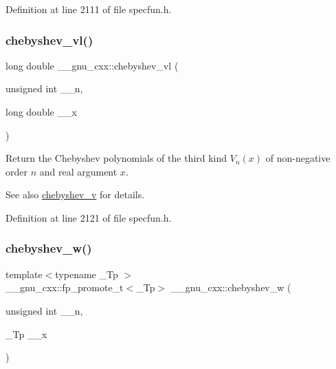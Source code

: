 Definition at line 2111 of file specfun.\+h.

\mbox{\label{group__gnu__math__spec__func_gae387ee1bfcd52555ad4d690f5888a078}} 
\subsubsection{\texorpdfstring{chebyshev\+\_\+vl()}{chebyshev\_vl()}}
{\footnotesize\ttfamily long double \+\_\+\+\_\+gnu\+\_\+cxx\+::chebyshev\+\_\+vl (\begin{DoxyParamCaption}\item[{unsigned int}]{\+\_\+\+\_\+n,  }\item[{long double}]{\+\_\+\+\_\+x }\end{DoxyParamCaption})\hspace{0.3cm}{\ttfamily [inline]}}

Return the Chebyshev polynomials of the third kind $ V_n(x) $ of non-\/negative order $ n $ and real argument $ x $.

\begin{DoxySeeAlso}{See also}
\hyperlink{group__gnu__math__spec__func_ga32b7decd0002f542d2c9187c5f0846c6}{chebyshev\+\_\+v} for details. 
\end{DoxySeeAlso}


Definition at line 2121 of file specfun.\+h.

\mbox{\label{group__gnu__math__spec__func_gaa156c6c21e99104ebcb627e92aceada0}} 
\subsubsection{\texorpdfstring{chebyshev\+\_\+w()}{chebyshev\_w()}}
{\footnotesize\ttfamily template$<$typename \+\_\+\+Tp $>$ \\
\+\_\+\+\_\+gnu\+\_\+cxx\+::fp\+\_\+promote\+\_\+t$<$\+\_\+\+Tp$>$ \+\_\+\+\_\+gnu\+\_\+cxx\+::chebyshev\+\_\+w (\begin{DoxyParamCaption}\item[{unsigned int}]{\+\_\+\+\_\+n,  }\item[{\+\_\+\+Tp}]{\+\_\+\+\_\+x }\end{DoxyParamCaption})\hspace{0.3cm}{\ttfamily [inline]}}

